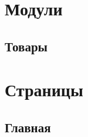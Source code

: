 \documentclass[DIV=calc, paper=a4, fontsize=11pt]{scrartcl} %
\begin{document}
\section{Модули}

\subsection{Товары}



\section{Страницы}

\subsection{Главная}
\end{document}
